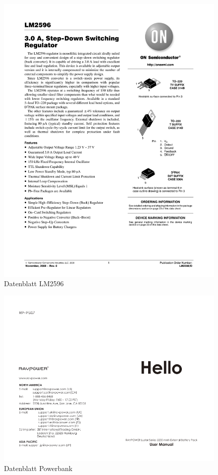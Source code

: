 \documentclass[12pt,a4paper]{article}
\begin{document}
{\begin{figure}[H]
  \centering
		\includegraphics[scale=0.75, angle=0,page=1]{graphics/LM2596.PDF}
		\caption{Datenblatt LM2596}
		\label{datasheet:LM2596}
\end{figure}

\begin{figure}[H]
  \centering
		\includegraphics[scale=1.5, angle=90,page=2]{graphics/powerbank.pdf}
		\caption{Datenblatt Powerbank}
		\label{datasheet:powerbank}
\end{figure}

}
\end{document}
